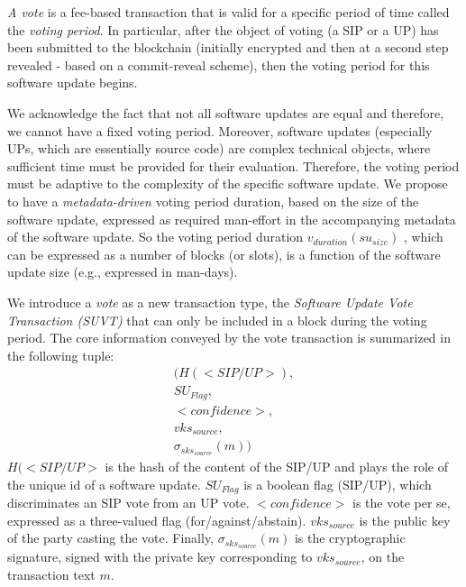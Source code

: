 \emph{A vote} is a fee-based transaction that is valid for a specific period of time called the \emph{voting period}. In particular, after the object of voting (a SIP or a UP) has been submitted to the blockchain (initially encrypted and then at a second step revealed - based on a commit-reveal scheme),%
then the voting period for this software update begins. 

We acknowledge the fact that not all software updates are equal and therefore, we cannot have a fixed voting period. Moreover, software updates (especially UPs, which are essentially source code) are complex technical objects, where sufficient time must be provided for their evaluation. Therefore, the voting period must be adaptive to the complexity of the specific software update. We propose to have a \emph{metadata-driven} voting period duration, based on the size of the software update, expressed as required man-effort in the accompanying metadata of the software update. So the voting period duration $v_{duration}(su_{size})$ , which can be expressed as a number of blocks (or slots), is a function of the software update size (e.g., expressed in man-days).

We introduce a \emph{vote} as a new transaction type, the \emph{Software Update Vote Transaction (SUVT)} that can only be included in a block during the voting period. The core information conveyed by the vote transaction is summarized in the following tuple:
\begin{align*}
( H(<SIP/UP>), \\
  SU_{Flag}, \\
  <confidence>, \\
  vks_{source}, \\
 \sigma_{sks_{source}}(m))
\end{align*}
$H(<SIP/UP>$ is the hash of the content of the SIP/UP and plays the role of the unique id of a software update. $SU_{Flag}$ is a boolean flag (SIP/UP), which discriminates an SIP vote from an UP vote. $<confidence>$ is the vote per se, expressed as a three-valued flag (for/against/abstain). $vks_{source}$ is the public key of the party casting the vote. Finally, $\sigma_{sks_{source}}(m)$ is the cryptographic signature, signed with the private key corresponding to $vks_{source}$, on the transaction text $m$.

